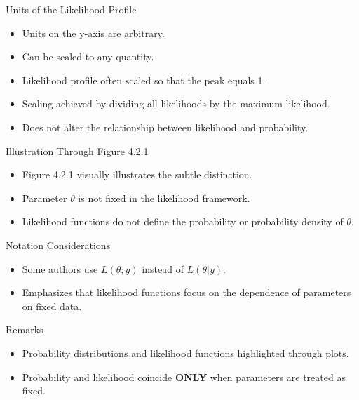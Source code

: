 \begin{frame}{Units of the Likelihood Profile}
  \begin{itemize}
    \item Units on the y-axis are arbitrary.
    \item Can be scaled to any quantity.
    \item Likelihood profile often scaled so that the peak equals 1.
    \item Scaling achieved by dividing all likelihoods by the maximum likelihood.
    \item Does not alter the relationship between likelihood and probability.
  \end{itemize}
\end{frame}

\begin{frame}{Illustration Through Figure 4.2.1}
  \begin{itemize}
    \item Figure 4.2.1 visually illustrates the subtle distinction.
    \item Parameter $\theta$ is not fixed in the likelihood framework.
    \item Likelihood functions do not define the probability or probability density of $\theta$.
  \end{itemize}
\end{frame}

\begin{frame}{Notation Considerations}
  \begin{itemize}
    \item Some authors use $L(\theta; y)$ instead of $L(\theta|y)$.
    \item Emphasizes that likelihood functions focus on the dependence of parameters on fixed data.
  \end{itemize}
\end{frame}

\begin{frame}{Remarks}
  \begin{itemize}
    \item Probability distributions and likelihood functions highlighted through plots.
    \item Probability and likelihood coincide {\bf{ONLY}} when parameters are treated as fixed.
  \end{itemize}
\end{frame}



